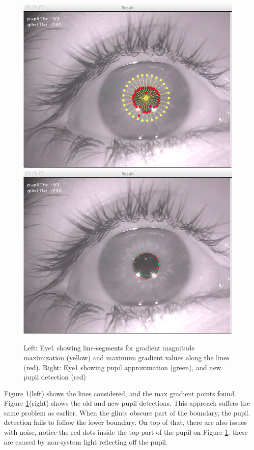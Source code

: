 \documentclass[a4paper,11pt]{article}
\begin{document}
\begin{figure}[ht]
  \centering
  \includegraphics[scale=0.25]{gradient_circle}
  \includegraphics[scale=0.25]{gradient_pupil}
  \caption{Left: Eye1 showing line-segments for gradient magnitude maximization (yellow) and maximum gradient values along the lines (red). Right: Eye1 showing pupil approximation (green), and new pupil detection (red)}
  \label{fig:gradient_circle}
\end{figure}

Figure \ref{fig:gradient_circle}(left) shows the lines considered, and the max gradient points found. Figure \ref{fig:gradient_circle}(right) shows the old and new pupil detections. This approach suffers the same problem as earlier. When the glints obscure part of the boundary, the pupil detection fails to follow the lower boundary. On top of that, there are also issues with noise, notice the red dots inside the top part of the pupil on Figure \ref{fig:gradient_circle}, these are caused by non-system light reflecting off the pupil.
\end{document}
